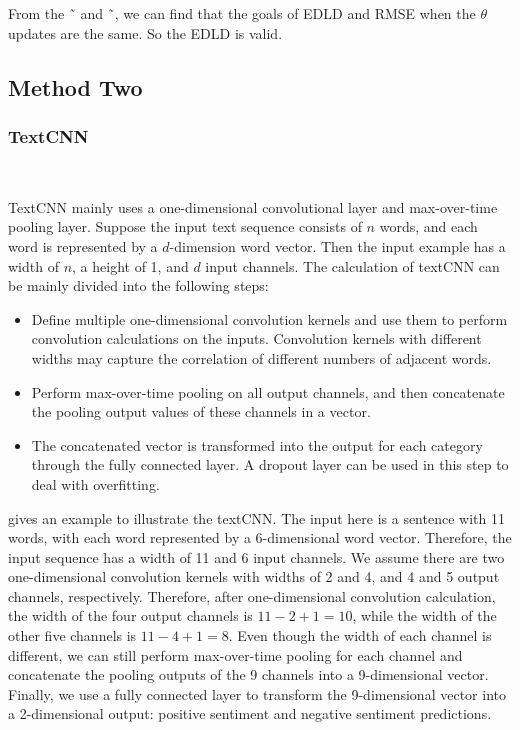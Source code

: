 From the ˜ and ˜, 
we can find that the goals of EDLD and  RMSE
when the $ \theta $ updates are the same.
So the EDLD is valid.
   

\subsection{Method Two}

\subsubsection{TextCNN}
\

TextCNN mainly uses 
a one-dimensional convolutional layer and 
max-over-time pooling layer. 
Suppose the input text sequence consists of $ n $ words, 
and each word is 
represented by a $ d $-dimension word vector. 
Then the input example has a width of $ n $,
a height of  1, and $ d $ input channels. 
The calculation of textCNN can 
be mainly divided into the following steps:

\begin{itemize}
	\item 
	Define multiple one-dimensional convolution kernels 
	and use them to 
	perform convolution calculations on the inputs. 
	Convolution kernels with different widths may 
	capture the correlation of different numbers of adjacent words.
	\item 
	Perform max-over-time pooling 
	on all output channels, 
	and then concatenate the pooling output values of 
	these channels in a vector.
	\item 
	The concatenated vector is 
	transformed into the output for 
	each category through the fully connected layer. 
	A dropout layer can be used in 
	this step to deal with overfitting.
\end{itemize}

gives an example to illustrate the textCNN.
The input here is a sentence with 11 words, 
with each word represented by 
a 6-dimensional word vector. 
Therefore, 
the input sequence has 
a width of 11 and 6 input channels. 
We assume there are 
two one-dimensional convolution kernels 
with widths of 2 and 4, 
and 4 and 5 output channels, 
respectively. 
Therefore, 
after one-dimensional convolution calculation, 
the width of the four output channels is  $ 11-2+1=10 $,
while the width of the other five channels is  $ 11-4+1=8 $. 
Even though the width of each channel is different, 
we can still perform max-over-time pooling for 
each channel and concatenate the pooling outputs of 
the 9 channels into a 9-dimensional vector. 
Finally, 
we use a fully connected layer to 
transform the 9-dimensional vector 
into a 2-dimensional output: 
positive sentiment and negative sentiment predictions.

